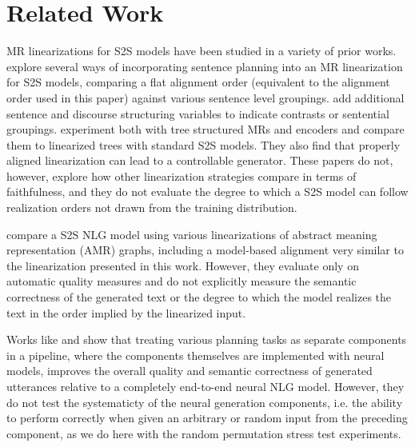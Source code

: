 \section{Related Work}
\label{sec:relatedwork}

MR linearizations for S2S models have been studied in a
variety of prior works. \citet{nayak2017} explore several ways of incorporating
sentence planning into an MR linearization for S2S models, comparing a flat
alignment order (equivalent to the alignment order used in this paper)
against various sentence level groupings.  \citet{reed2018} add additional
sentence and discourse structuring variables to indicate contrasts or
sentential groupings.  \citet{balakrishnan2019} experiment
both with tree structured MRs and encoders and compare them to linearized trees
with standard S2S models. They also find that properly
aligned linearization can lead to a controllable generator.
These papers do not, however, explore how other linearization
strategies compare in terms of faithfulness, and they do not evaluate the
degree to which a S2S model can follow realization orders not drawn from the
training distribution.

{\color{red}\citet{castroferreira2017} compare a S2S NLG model using various
linearizations of abstract meaning representation (AMR) graphs, including a
model-based alignment very similar to the  linearization presented
in this work. However, they evaluate only on automatic quality measures and do
not explicitly measure the semantic correctness of the generated text or the
degree to which the model realizes the text in the order implied by the
linearized input.}

{\color{red}Works like \citet{moryossef2019a,moryossef2019b} and
\citet{castroferreira2019} show that treating various planning tasks as
separate components in a pipeline, where the components themselves are
implemented with neural models, improves the overall quality and semantic
correctness of generated utterances relative to a completely end-to-end neural
NLG model. However, they do not test the systematicty of the neural generation
components, i.e. the ability to perform correctly when given an arbitrary or
random input from the preceding component, as we do here with the random
permutation stress test experiments. }


%



